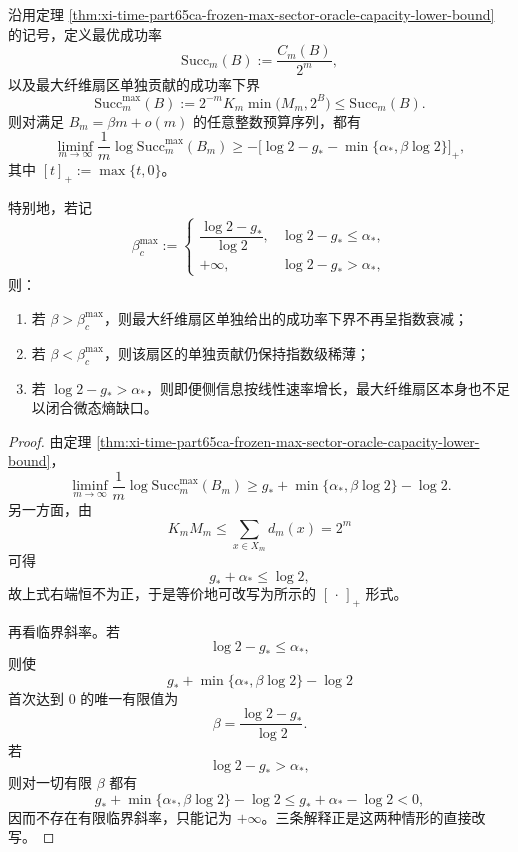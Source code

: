 \begin{corollary}[最大纤维扇区的侧信息临界斜率]\label{cor:xi-time-part65ca-frozen-max-sector-sideinfo-critical-slope}
沿用定理 \ref{thm:xi-time-part65ca-frozen-max-sector-oracle-capacity-lower-bound} 的记号，定义最优成功率
\[
\mathrm{Succ}_m(B):=\frac{C_m(B)}{2^m},
\]
以及最大纤维扇区单独贡献的成功率下界
\[
\mathrm{Succ}_m^{\max}(B)
:=
2^{-m}K_m\min\bigl(M_m,2^B\bigr)
\le
\mathrm{Succ}_m(B).
\]
则对满足 \(B_m=\beta m+o(m)\) 的任意整数预算序列，都有
\[
\boxed{\;
\liminf_{m\to\infty}\frac{1}{m}\log \mathrm{Succ}_m^{\max}(B_m)
\ge
-\bigl[\log 2-g_*-\min\{\alpha_*,\beta\log 2\}\bigr]_+,\;}
\]
其中 \([t]_+:=\max\{t,0\}\)。

特别地，若记
\[
\beta_c^{\max}
:=
\begin{cases}
\dfrac{\log 2-g_*}{\log 2},
& \log 2-g_*\le \alpha_*,\\[8pt]
+\infty,
& \log 2-g_*>\alpha_*,
\end{cases}
\]
则：
\begin{enumerate}
  \item 若 \(\beta>\beta_c^{\max}\)，则最大纤维扇区单独给出的成功率下界不再呈指数衰减；
  \item 若 \(\beta<\beta_c^{\max}\)，则该扇区的单独贡献仍保持指数级稀薄；
  \item 若 \(\log 2-g_*>\alpha_*\)，则即便侧信息按线性速率增长，最大纤维扇区本身也不足以闭合微态熵缺口。
\end{enumerate}
\end{corollary}
\begin{proof}
由定理 \ref{thm:xi-time-part65ca-frozen-max-sector-oracle-capacity-lower-bound}，
\[
\liminf_{m\to\infty}\frac{1}{m}\log \mathrm{Succ}_m^{\max}(B_m)
\ge
g_*+\min\{\alpha_*,\beta\log 2\}-\log 2.
\]
另一方面，由
\[
K_mM_m\le \sum_{x\in X_m}d_m(x)=2^m
\]
可得
\[
g_*+\alpha_*\le \log 2,
\]
故上式右端恒不为正，于是等价地可改写为所示的
\([\,\cdot\,]_+\) 形式。

再看临界斜率。若
\[
\log 2-g_*\le \alpha_*,
\]
则使
\[
g_*+\min\{\alpha_*,\beta\log 2\}-\log 2
\]
首次达到 \(0\) 的唯一有限值为
\[
\beta=\frac{\log 2-g_*}{\log 2}.
\]
若
\[
\log 2-g_*>\alpha_*,
\]
则对一切有限 \(\beta\) 都有
\[
g_*+\min\{\alpha_*,\beta\log 2\}-\log 2
\le
g_*+\alpha_*-\log 2<0,
\]
因而不存在有限临界斜率，只能记为 \(+\infty\)。三条解释正是这两种情形的直接改写。
\end{proof}

\endinput
